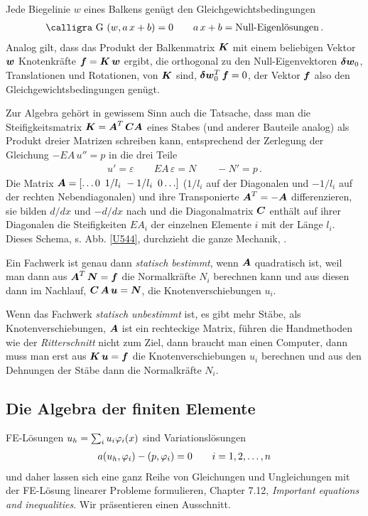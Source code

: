 Jede Biegelinie $w$ eines Balkens gen\"{u}gt den Gleichgewichtsbedingungen
\begin{align}
\text{\normalfont\calligra G\,\,}(w,a\,x + b) = 0 \qquad a\,x + b = \text{Null-Eigenl\"{o}sungen}\,.
\end{align}
Analog gilt, dass das Produkt der Balkenmatrix $\mbox{\boldmath $K$}$ mit einem beliebigen Vektor $\mbox{\boldmath $w$}$ Knotenkr\"{a}fte $\mbox{\boldmath $f$} = \mbox{\boldmath $K$}\,\mbox{\boldmath $w$}$ ergibt, die orthogonal zu den Null-Eigenvektoren $\mbox{\boldmath $\delta$} \mbox{\boldmath $w$}_0$, Translationen und Rotationen, von $\mbox{\boldmath $K$}$ sind, $\mbox{\boldmath $\delta$} \mbox{\boldmath $w$}_0^T\,\mbox{\boldmath $f$} = 0$, der Vektor $\mbox{\boldmath $f$}$ also den Gleichgewichtsbedingungen gen\"{u}gt.

Zur Algebra geh\"{o}rt in gewissem Sinn auch die Tatsache, dass man die Steifigkeitsmatrix $\mbox{\boldmath $K$} = \mbox{\boldmath $A$}^T\,\mbox{\boldmath $C$} \mbox{\boldmath $A$}$ eines Stabes (und anderer Bauteile analog) als Produkt dreier Matrizen schreiben kann, entsprechend der Zerlegung der Gleichung $-EA\,u'' = p$ in die drei Teile
\begin{align}
u' = \varepsilon \qquad EA\,\varepsilon = N \qquad - N' = p\,.
\end{align}
Die Matrix $\mbox{\boldmath $A$} = [\ldots 0\,\, \,1/l_i\,\,-1/l_i\,\,\,0 \ldots]$ ($1/l_i$ auf der Diagonalen und $-1/l_i$ auf der rechten Nebendiagonalen) und ihre Transponierte $\mbox{\boldmath $A$}^T = - \mbox{\boldmath $A$}$ \glq differenzieren\grq{}, sie bilden $d/dx$ und $-d/dx$ nach und die Diagonalmatrix $\mbox{\boldmath $C$}$ enth\"{a}lt auf ihrer Diagonalen die Steifigkeiten $EA_i$ der einzelnen Elemente $i$ mit der L\"{a}nge $l_i$. Dieses Schema, s. Abb. \ref{U544}, durchzieht die ganze Mechanik, \cite{Strang4}.

Ein Fachwerk ist genau dann {\em statisch bestimmt\/}, wenn $\mbox{\boldmath $A$}$ quadratisch ist, weil man dann aus $\mbox{\boldmath $A$}^T\,\mbox{\boldmath $N$} = \mbox{\boldmath $f$}$ die Normalkr\"{a}fte $N_i$ berechnen kann  und aus diesen dann im Nachlauf, $ \mbox{\boldmath $C$}\,\mbox{\boldmath $A$} \,\mbox{\boldmath $u$} = \mbox{\boldmath $N$}$,  die Knotenverschiebungen $u_i$.

Wenn das Fachwerk {\em statisch unbestimmt\/} ist, es gibt mehr St\"{a}be, als Knotenverschiebungen, $ \mbox{\boldmath $A$}$ ist ein rechteckige Matrix, f\"{u}hren die Handmethoden wie der {\em Ritterschnitt\/} nicht zum Ziel, dann braucht man einen Computer, dann muss man erst aus $\mbox{\boldmath $K$}\,\mbox{\boldmath $u$} = \mbox{\boldmath $f$} $ die Knotenverschiebungen $u_i$ berechnen und aus den Dehnungen der St\"{a}be dann die Normalkr\"{a}fte $N_i $.

\textcolor{sectionTitleBlue}{\section{Die Algebra der finiten Elemente}}
FE-L\"{o}sungen $u_h = \sum_i u_i\varphi_i(x)$ sind Variationsl\"{o}sungen
\begin{align}
a(u_h,\varphi_i) - (p,\varphi_i) = 0 \qquad i = 1,2,\ldots, n
\end{align}
und daher lassen sich eine ganz Reihe von Gleichungen und Ungleichungen mit der FE-L\"{o}sung linearer Probleme formulieren, \cite{Ha4} Chapter 7.12, {\em Important equations and inequalities\/}. Wir pr\"{a}sentieren einen Ausschnitt.

